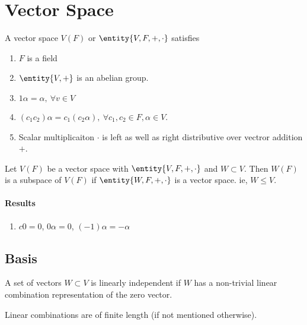 \section{Vector Space}
\begin{definition}
	A vector space $V(F)$ or $\entity{V,F,+,\cdot}$ satisfies
	\begin{enumerate}
		\item $F$ is a field
		\item $\entity{V,+}$ is an abelian group.
		\item $1\alpha=\alpha,\ \forall v \in V$
		\item $(c_1c_2)\alpha = c_1 (c_2\alpha),\ \forall c_1,c_2 \in F, \alpha \in V$.
		\item Scalar multiplicaiton $\cdot$ is left as well as right distributive over vectror addition $+$.
	\end{enumerate}
\end{definition}

\begin{definition}[subspace]
	Let $V(F)$ be a vector space with $\entity{V,F,+,\cdot}$ and $W \subset V$.
	Then $W(F)$ is a subspace of $V(F)$ if $\entity{W,F,+,\cdot}$ is a vector space.
	ie, $W \le V$.
\end{definition}

\paragraph{Results}
\begin{enumerate}
	\item $c0 = 0$, $0\alpha = 0$, $(-1)\alpha = -\alpha$
\end{enumerate}

\subsection{Basis}
\begin{definition}
	A set of vectors $W \subset V$ is linearly independent if $W$ has a non-trivial linear combination representation of the zero vector.
\end{definition}
\begin{note}
	Linear combinations are of finite length (if not mentioned otherwise).
\end{note}


